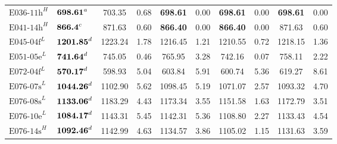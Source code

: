 \begin{table}[ht]
\begin{tabular}{@{}llcccccccc@{}}
        $\text{E036-11h}^H$ & $\text{\textbf{698.61}}^a$  & 703.35                           & 0.68                       & \textbf{698.61}             & 0.00                       & \textbf{698.61}  & 0.00         & \textbf{698.61} & 0.00         \\
        $\text{E041-14h}^H$ & $\text{\textbf{866.4}}^c$   & 871.63                           & 0.60                       & \textbf{866.40}             & 0.00                       & \textbf{866.40}  & 0.00         & 871.63          & 0.60         \\
        $\text{E045-04f}^L$ & $\text{\textbf{1201.85}}^d$ & 1223.24                          & 1.78                       & 1216.45                     & 1.21                       & 1210.55          & 0.72         & 1218.15         & 1.36         \\
        $\text{E051-05e}^L$ & $\text{\textbf{741.64}}^d$  & 745.05                           & 0.46                       & 765.95                      & 3.28                       & 742.16           & 0.07         & 758.11          & 2.22         \\
        $\text{E072-04f}^L$ & $\text{\textbf{570.17}}^d$  & 598.93                           & 5.04                       & 603.84                      & 5.91                       & 600.74           & 5.36         & 619.27          & 8.61         \\
        $\text{E076-07s}^L$ & $\text{\textbf{1044.26}}^d$ & 1102.90                          & 5.62                       & 1098.45                     & 5.19                       & 1071.07          & 2.57         & 1093.32         & 4.70         \\
        $\text{E076-08s}^L$ & $\text{\textbf{1133.06}}^d$ & 1183.29                          & 4.43                       & 1173.34                     & 3.55                       & 1151.58          & 1.63         & 1172.79         & 3.51         \\
        $\text{E076-10e}^L$ & $\text{\textbf{1084.17}}^d$ & 1143.31                          & 5.45                       & 1142.31                     & 5.36                       & 1108.80          & 2.27         & 1133.43         & 4.54         \\
        $\text{E076-14s}^H$ & $\text{\textbf{1092.46}}^d$ & 1142.99                          & 4.63                       & 1134.57                     & 3.86                       & 1105.02          & 1.15         & 1131.63         & 3.59         \\

\end{tabular}
\end{table}
